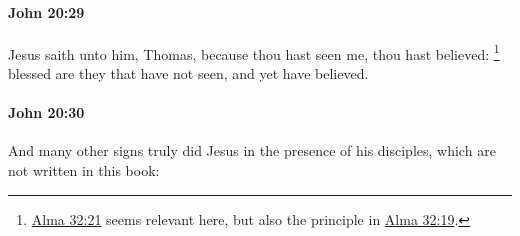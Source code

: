 		\paragraph{John 20:29} %
			\label{JOHN-20-29}

			Jesus saith unto him, Thomas, because thou hast seen me, thou hast believed:%
				\footnote{%
					\hyperref[ALMA-32-21]{Alma 32:21} seems relevant here, but also the principle in \hyperref[ALMA-32-19]{Alma 32:19}.
					}
			blessed are they that have not seen, and yet have believed.

			\begin{framed}
				\scriptsize
				\begin{compactdesc}
					\item[SBLG] 
				\end{compactdesc}
			\end{framed}

		\paragraph{John 20:30} %
			\label{JOHN-20-30}

			And many other signs truly did Jesus in the presence of his disciples, which are not written in this book:

